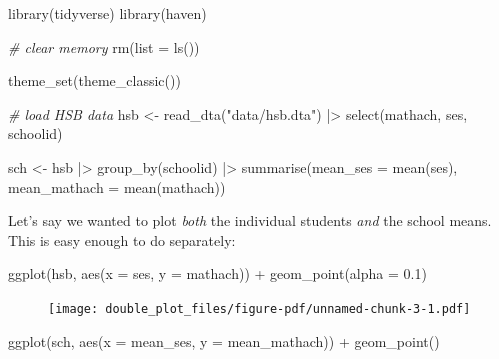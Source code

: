 \documentclass[
  letterpaper,
  DIV=11,
  numbers=noendperiod]{scrreprt}
\newenvironment{Shaded}{\begin{snugshade}}{\end{snugshade}}
\newcommand{\AttributeTok}[1]{\textcolor[rgb]{0.49,0.56,0.16}{#1}}
\newcommand{\CommentTok}[1]{\textcolor[rgb]{0.38,0.63,0.69}{\textit{#1}}}
\newcommand{\FloatTok}[1]{\textcolor[rgb]{0.25,0.63,0.44}{#1}}
\newcommand{\FunctionTok}[1]{\textcolor[rgb]{0.02,0.16,0.49}{#1}}
\newcommand{\NormalTok}[1]{\textcolor[rgb]{0.00,0.44,0.13}{#1}}
\newcommand{\OtherTok}[1]{\textcolor[rgb]{0.00,0.44,0.13}{#1}}
\newcommand{\SpecialCharTok}[1]{\textcolor[rgb]{0.25,0.44,0.63}{#1}}
\newcommand{\StringTok}[1]{\textcolor[rgb]{0.25,0.44,0.63}{#1}}
\begin{document}
\begin{Shaded}
\begin{Highlighting}[]
\FunctionTok{library}\NormalTok{(tidyverse)}
\FunctionTok{library}\NormalTok{(haven)}

\CommentTok{\# clear memory}
\FunctionTok{rm}\NormalTok{(}\AttributeTok{list =} \FunctionTok{ls}\NormalTok{())}

\FunctionTok{theme\_set}\NormalTok{(}\FunctionTok{theme\_classic}\NormalTok{())}

\CommentTok{\# load HSB data}
\NormalTok{hsb }\OtherTok{\textless{}{-}} \FunctionTok{read\_dta}\NormalTok{(}\StringTok{"data/hsb.dta"}\NormalTok{) }\SpecialCharTok{|\textgreater{}} 
  \FunctionTok{select}\NormalTok{(mathach, ses, schoolid)}

\NormalTok{sch }\OtherTok{\textless{}{-}}\NormalTok{ hsb }\SpecialCharTok{|\textgreater{}} 
  \FunctionTok{group\_by}\NormalTok{(schoolid) }\SpecialCharTok{|\textgreater{}} 
  \FunctionTok{summarise}\NormalTok{(}\AttributeTok{mean\_ses =} \FunctionTok{mean}\NormalTok{(ses),}
            \AttributeTok{mean\_mathach =} \FunctionTok{mean}\NormalTok{(mathach))}
\end{Highlighting}
\end{Shaded}

Let's say we wanted to plot \emph{both} the individual students
\emph{and} the school means. This is easy enough to do separately:

\begin{Shaded}
\begin{Highlighting}[]
\FunctionTok{ggplot}\NormalTok{(hsb, }\FunctionTok{aes}\NormalTok{(}\AttributeTok{x =}\NormalTok{ ses, }\AttributeTok{y =}\NormalTok{ mathach)) }\SpecialCharTok{+}
  \FunctionTok{geom\_point}\NormalTok{(}\AttributeTok{alpha =} \FloatTok{0.1}\NormalTok{)}
\end{Highlighting}
\end{Shaded}

\begin{figure}[H]

{\centering \texttt{[image: double\_plot\_files/figure-pdf/unnamed-chunk-3-1.pdf]}

}

\end{figure}

\begin{Shaded}
\begin{Highlighting}[]
\FunctionTok{ggplot}\NormalTok{(sch, }\FunctionTok{aes}\NormalTok{(}\AttributeTok{x =}\NormalTok{ mean\_ses, }\AttributeTok{y =}\NormalTok{ mean\_mathach)) }\SpecialCharTok{+}
  \FunctionTok{geom\_point}\NormalTok{()}
\end{Highlighting}
\end{Shaded}
\end{document}
